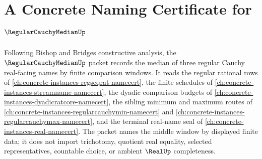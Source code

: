 \chapter{A Concrete Naming Certificate for $\RegularCauchyMedianUp$}
\label{ch:concrete-instances-regular-cauchy-median-namecert}

Following Bishop and Bridges constructive analysis, the $\RegularCauchyMedianUp$ packet records the median of three regular Cauchy real-facing names by finite comparison windows. It reads the regular rational rows of \autoref{ch:concrete-instances-regseqrat-namecert}, the finite schedules of \autoref{ch:concrete-instances-streamname-namecert}, the dyadic comparison budgets of \autoref{ch:concrete-instances-dyadicratcore-namecert}, the sibling minimum and maximum routes of \autoref{ch:concrete-instances-regularcauchymin-namecert} and \autoref{ch:concrete-instances-regularcauchymax-namecert}, and the terminal real-name seal of \autoref{ch:concrete-instances-real-namecert}. The packet names the middle window by displayed finite data; it does not import trichotomy, quotient real equality, selected representatives, countable choice, or ambient $\RealUp$ completeness.

